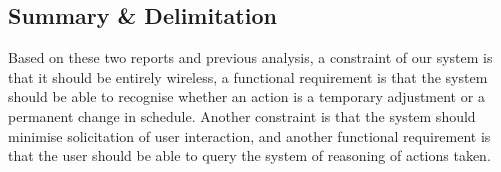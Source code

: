 \subsection{Summary \& Delimitation}
Based on these two reports and previous analysis, a constraint of our system is that it should be entirely wireless, a functional requirement is that the system should be able to recognise whether an action is a temporary adjustment or a permanent change in schedule. Another constraint is that the system should minimise solicitation of user interaction, and another functional requirement is that the user should be able to query the system of reasoning of actions taken.
